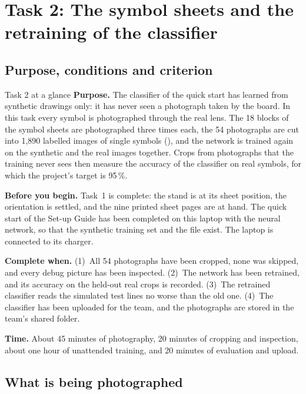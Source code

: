 \section{Task 2: The symbol sheets and the retraining of the classifier}
\label{sec:t2}

\subsection{Purpose, conditions and criterion}

\begin{plain}{Task 2 at a glance}
\textbf{Purpose.} The classifier of the quick start has learned from synthetic drawings only: it
has never seen a photograph taken by the board. In this task every symbol is photographed
through the real lens. The 18 blocks of the symbol sheets are photographed three times each,
the 54 photographs are cut into 1{,}890 labelled images of single symbols (), and
the network is trained again on the synthetic and the real images together. Crops from
photographs that the training never sees then measure the accuracy of the classifier on real
symbols, for which the project's target is 95\,\%.

\textbf{Before you begin.} Task~1 is complete: the stand is at its sheet position, the
orientation is settled, and the nine printed sheet pages are at hand. The quick start of the
Set-up Guide has been completed on this laptop with the neural network, so that the synthetic
training set and the file  exist. The laptop is connected
to its charger.

\textbf{Complete when.} (1)~All 54 photographs have been cropped, none was skipped, and every
debug picture has been inspected. (2)~The network has been retrained, and its accuracy on the
held-out real crops is recorded. (3)~The retrained classifier reads the simulated test lines
no worse than the old one. (4)~The classifier has been uploaded for the team, and the
photographs are stored in the team's shared folder.

\textbf{Time.} About 45 minutes of photography, 20 minutes of cropping and inspection, about
one hour of unattended training, and 20 minutes of evaluation and upload.
\end{plain}

\subsection{What is being photographed}

